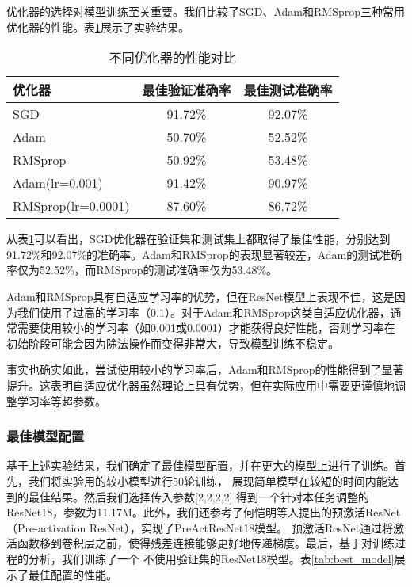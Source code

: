 \documentclass[12pt,a4paper]{article}
\begin{document}
优化器的选择对模型训练至关重要。我们比较了SGD、Adam和RMSprop三种常用优化器的性能。表\ref{tab:optimizers}展示了实验结果。

\begin{table}[htbp]
\centering
\caption{不同优化器的性能对比}
\label{tab:optimizers}
\begin{tabular}{lcc}
\toprule
\textbf{优化器} & \textbf{最佳验证准确率} & \textbf{最佳测试准确率} \\
\midrule
SGD & 91.72\% & 92.07\% \\
Adam & 50.70\% & 52.52\% \\
RMSprop & 50.92\% & 53.48\% \\
Adam(lr=0.001) & 91.42\% & 90.97\% \\
RMSprop(lr=0.0001) & 87.60\% & 86.72\% \\
\bottomrule
\end{tabular}
\end{table}

从表\ref{tab:optimizers}可以看出，SGD优化器在验证集和测试集上都取得了最佳性能，分别达到91.72\%和92.07\%的准确率。Adam和RMSprop的表现显著较差，Adam的测试准确率仅为52.52\%，而RMSprop的测试准确率仅为53.48\%。

Adam和RMSprop具有自适应学习率的优势，但在ResNet模型上表现不佳，这是因为我们使用了过高的学习率（0.1）。对于Adam和RMSprop这类自适应优化器，通常需要使用较小的学习率（如0.001或0.0001）才能获得良好性能，否则学习率在初始阶段可能会因为除法操作而变得非常大，导致模型训练不稳定。

事实也确实如此，尝试使用较小的学习率后，Adam和RMSprop的性能得到了显著提升。这表明自适应优化器虽然理论上具有优势，但在实际应用中需要更谨慎地调整学习率等超参数。

\subsubsection{最佳模型配置}

基于上述实验结果，我们确定了最佳模型配置，并在更大的模型上进行了训练。首先，我们将实验用的较小模型进行50轮训练，
展现简单模型在较短的时间内能达到的最佳结果。然后我们选择传入参数[2,2,2,2]
得到一个针对本任务调整的ResNet18，参数为11.17M。此外，我们还参考了何恺明等人提出的预激活ResNet（Pre-activation ResNet）\cite{preact_resnet}，实现了PreActResNet18模型。
预激活ResNet通过将激活函数移到卷积层之前，使得残差连接能够更好地传递梯度。最后，基于对训练过程的分析，我们训练了一个
不使用验证集的ResNet18模型。表\ref{tab:best_model}展示了最佳配置的性能。
\end{document}
